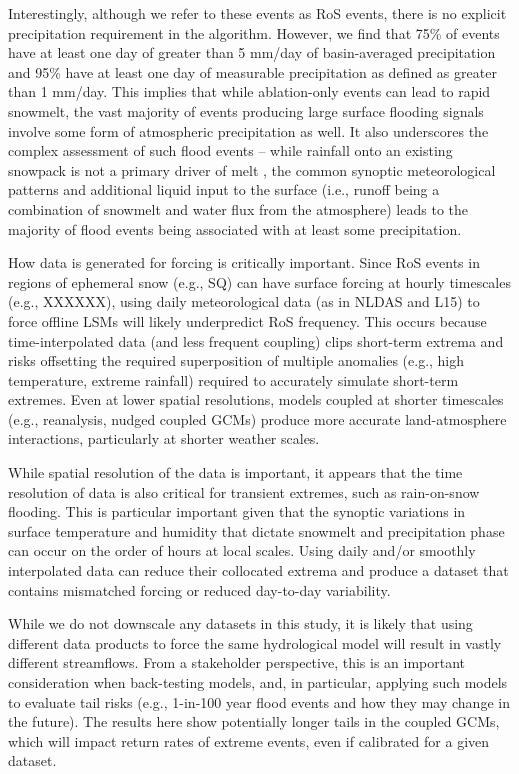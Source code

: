 \documentclass[draft]{agujournal2019}
\begin{document}
Interestingly, although we refer to these events as RoS events, there is no explicit precipitation requirement in the algorithm. However, we find that 75\% of events have at least one day of greater than 5 mm/day of basin-averaged precipitation and 95\% have at least one day of measurable precipitation as defined as greater than 1 mm/day. This implies that while ablation-only events can lead to rapid snowmelt, the vast majority of events producing large surface flooding signals involve some form of atmospheric precipitation as well. It also underscores the complex assessment of such flood events -- while rainfall onto an existing snowpack is not a primary driver of melt \citep{harpold2018humidity}, the common synoptic meteorological patterns \citep{grote2021synoptic} and additional liquid input to the surface (i.e., runoff being a combination of snowmelt and water flux from the atmosphere) leads to the majority of flood events being associated with at least some precipitation.

How data is generated for forcing is critically important. Since RoS events in regions of ephemeral snow (e.g., SQ) can have surface forcing at hourly timescales (e.g., XXXXXX), using daily meteorological data (as in NLDAS and L15) to force offline LSMs will likely underpredict RoS frequency. This occurs because time-interpolated data (and less frequent coupling) clips short-term extrema and risks offsetting the required superposition of multiple anomalies (e.g., high temperature, extreme rainfall) required to accurately simulate short-term extremes. Even at lower spatial resolutions, models coupled at shorter timescales (e.g., reanalysis, nudged coupled GCMs) produce more accurate land-atmosphere interactions, particularly at shorter weather scales.

While spatial resolution of the data is important, it appears that the time resolution of data is also critical for transient extremes, such as rain-on-snow flooding. This is particular important given that the synoptic variations in surface temperature and humidity that dictate snowmelt and precipitation phase can occur on the order of hours at local scales. Using daily and/or smoothly interpolated data can reduce their collocated extrema and produce a dataset that contains mismatched forcing or reduced day-to-day variability.

While we do not downscale any datasets in this study, it is likely that using different data products to force the same hydrological model will result in vastly different streamflows. From a stakeholder perspective, this is an important consideration when back-testing models, and, in particular, applying such models to evaluate tail risks (e.g., 1-in-100 year flood events and how they may change in the future). The results here show potentially longer tails in the coupled GCMs, which will impact return rates of extreme events, even if calibrated for a given dataset.
\end{document}
